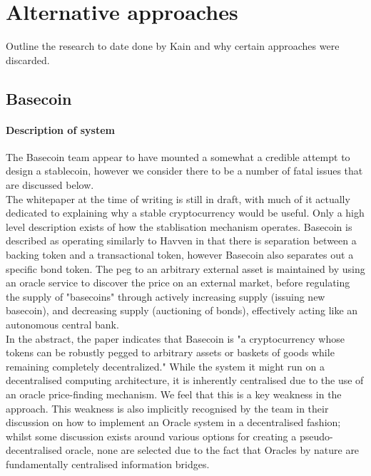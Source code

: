 \section{Alternative approaches}

Outline the research to date done by Kain and why certain approaches were discarded.



\subsection{Basecoin}

\paragraph{Description of system}

The Basecoin team appear to have mounted a somewhat a credible attempt to design a stablecoin, however we consider there to be a number of fatal issues that are discussed below. \\

\noindent The whitepaper at the time of writing is still in draft, with much of it actually dedicated to explaining why a stable cryptocurrency would be useful. Only a high level description exists of how the stablisation mechanism operates. Basecoin is described as operating similarly to Havven in that there is separation between a backing token and a transactional token, however Basecoin also separates out a specific bond token. The peg to an arbitrary external asset is maintained by using an oracle service to discover the price on an external market, before regulating the supply of "basecoins" through actively increasing supply (issuing new basecoin), and decreasing supply (auctioning of bonds), effectively acting like an autonomous central bank. \\

\noindent In the abstract, the paper indicates that Basecoin is  "a cryptocurrency whose tokens can be robustly pegged to arbitrary assets or baskets of goods while remaining completely decentralized." While the system it might run on a decentralised computing architecture, it is inherently centralised due to the use of an oracle price-finding mechanism. We feel that this is a key weakness in the approach. This weakness is also implicitly recognised by the team in their discussion on how to implement an Oracle system in a decentralised fashion; whilst some discussion exists around various options for creating a pseudo-decentralised oracle, none are selected due to the fact that Oracles by nature are fundamentally centralised information bridges. \\

